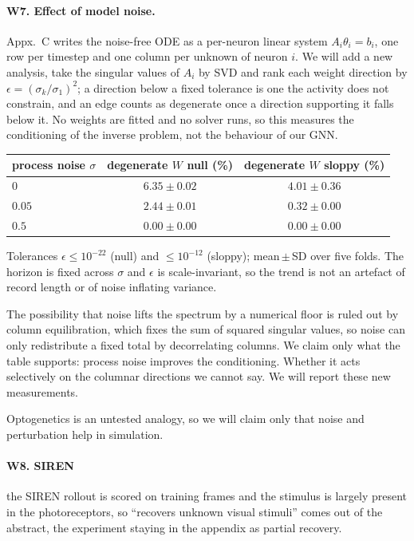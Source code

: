 \documentclass[11pt]{article}
\begin{document}
\paragraph{W7. Effect of model noise.}
Appx.~C writes the noise-free ODE
as a per-neuron linear system $A_i \theta_i = b_i$, one row per timestep and one
column per unknown of neuron $i$. We will add a new analysis, take the singular values of $A_i$ by SVD and
rank each weight direction by $\epsilon = (\sigma_k/\sigma_1)^2$; a direction
below a fixed tolerance is one the activity does not constrain, and an edge
counts as degenerate once a direction supporting it falls below it. No weights
are fitted and no solver runs, so this measures the conditioning of the inverse
problem, not the behaviour of our GNN.
\begin{center}
{\footnotesize
\begin{tabular}{lcc}
\toprule
process noise $\sigma$ & degenerate $W$ null (\%) & degenerate $W$ sloppy (\%) \\
\midrule
$0$    & $6.35 \pm 0.02$ & $4.01 \pm 0.36$ \\
$0.05$ & $2.44 \pm 0.01$ & $0.32 \pm 0.00$ \\
$0.5$  & $0.00 \pm 0.00$ & $0.00 \pm 0.00$ \\
\bottomrule
\end{tabular}}

{\footnotesize Tolerances $\epsilon \leq 10^{-22}$ (null) and $\leq 10^{-12}$
(sloppy); mean\,$\pm$\,SD over five folds. The horizon is fixed across $\sigma$
and $\epsilon$ is scale-invariant, so the trend is not an artefact of record
length or of noise inflating variance.}
\end{center}
The possibility that noise lifts the spectrum by a numerical floor is ruled out by column equilibration,
which fixes the sum of squared singular values, so noise can only redistribute a
fixed total by decorrelating columns. We claim only what the table supports:
process noise improves the conditioning. Whether it acts selectively on the
columnar directions we cannot say. We will report these new measurements.

Optogenetics is an
untested analogy, so we will claim only that noise and perturbation
help in simulation. 
\paragraph{W8. SIREN} the SIREN rollout is scored on training frames and the
stimulus is largely present in the photoreceptors, so ``recovers unknown visual
stimuli'' comes out of the abstract, the experiment staying in the appendix as
partial recovery.
\end{document}
